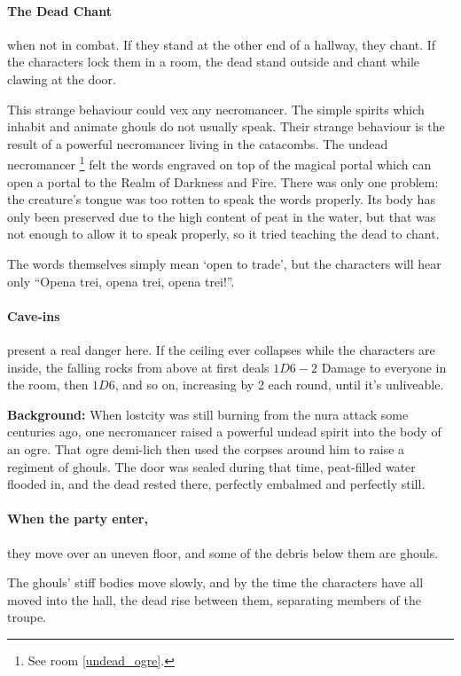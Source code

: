 \begin{multicols}{2}
\paragraph{The Dead Chant} when not in combat.
If they stand at the other end of a hallway, they chant.
If the characters lock them in a room, the dead stand outside and chant while clawing at the door.

This strange behaviour could vex any necromancer.
The simple spirits which inhabit and animate ghouls do not usually speak.
Their strange behaviour is the result of a powerful necromancer living in the catacombs.
The undead necromancer%
\footnote{See room \ref{undead_ogre}.}
felt the words engraved on top of the magical portal which can open a portal to the Realm of Darkness and Fire.
There was only one problem: the creature's tongue was too rotten to speak the words properly.
Its body has only been preserved due to the high content of peat in the water, but that was not enough to allow it to speak properly, so it tried teaching the dead to chant.

The words themselves simply mean `open to trade', but the characters will hear only ``Opena trei, opena trei, opena trei!''.

\paragraph{Cave-ins} present a real danger here.  If the ceiling ever collapses while the characters are inside, the falling rocks from above at first deals $1D6-2$ Damage to everyone in the room, then $1D6$, and so on, increasing by 2 each round, until it's unliveable.


\textbf{Background:}
When \gls{lostcity} was still burning from the nura attack some centuries ago, one necromancer raised a powerful undead spirit into the body of an ogre.
That ogre demi-lich then used the corpses around him to raise a regiment of ghouls.
The door was sealed during that time, peat-filled water flooded in, and the dead rested there, perfectly embalmed and perfectly still.

\paragraph{When the party enter,}
they move over an uneven floor, and some of the debris below them are ghouls.

The ghouls' stiff bodies move slowly, and by the time the characters have all moved into the hall, the dead rise between them, separating members of the troupe.


\end{multicols}
